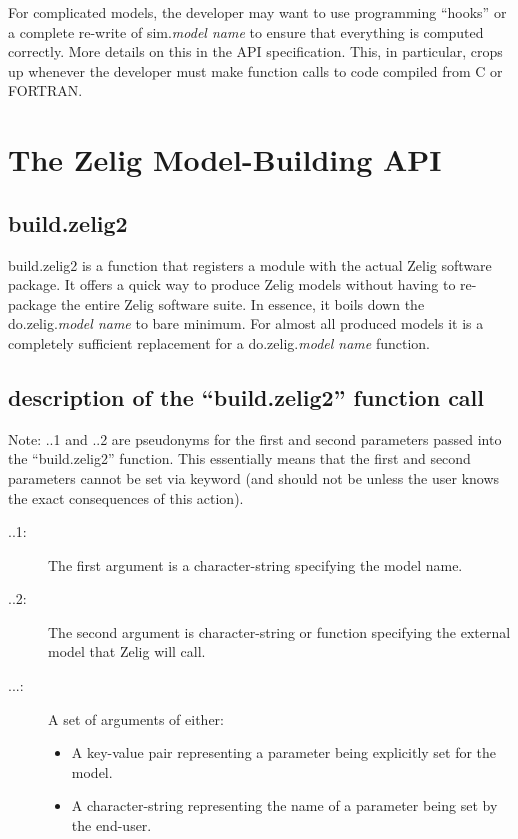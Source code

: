\documentclass[a4paper, 11pt]{article}
\begin{document}
For complicated models, the developer may want to use programming ``hooks'' or a complete re-write of sim.\emph{model name} to ensure that everything is computed correctly.  More details on this in the API specification.  This, in particular, crops up whenever the developer must make function calls to code compiled from C or FORTRAN.

\section{The Zelig Model-Building API}

\subsection{build.zelig2}
build.zelig2 is a function that registers a module with the actual Zelig software package.  It offers a quick way to produce Zelig models without having to re-package the entire Zelig software suite.  In essence, it boils down the do.zelig.\emph{model name} to bare minimum.  For almost all produced models it is a completely sufficient replacement for a do.zelig.\emph{model name} function.


\subsection{description of the ``build.zelig2'' function call}
Note: ..1 and ..2 are pseudonyms for the first and second parameters passed into the ``build.zelig2'' function.  This essentially means that the first and second parameters cannot be set via keyword (and should not be unless the user knows the exact consequences of this action).


\begin{description}
	\item[..1:]{The first argument is a character-string specifying the model name.}
	\item[..2:]{The second argument is character-string or function specifying the external model that Zelig will call.}
	\item[...:]{A set of arguments of either: 
		\begin{itemize}
			\item{A key-value pair representing a parameter being explicitly set for the model.}
			\item{A character-string representing the name of a parameter being set by the end-user.}
		\end{itemize}
	}
\end{description}
\end{document}
